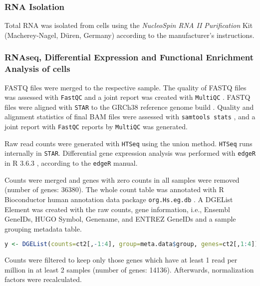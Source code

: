 \subsubsection*{RNA Isolation}
Total RNA was isolated from \INA cells using the \textit{NucleoSpin RNA II
    Purification} Kit (Macherey-Nagel, Düren, Germany) according to the
manufacturer's instructions.






\subsubsection*{RNAseq, Differential Expression and Functional Enrichment Analysis of \INA cells}%
FASTQ files were merged to the respective sample. The quality of FASTQ files was
assessed with \texttt{FastQC} \cite{andrewsFastQCQualityControl2010} and a joint
report was created with \texttt{MultiQC}
\cite{ewelsMultiQCSummarizeAnalysis2016}. FASTQ files were aligned with
\texttt{STAR} \cite{dobinSTARUltrafastUniversal2013} to the GRCh38 reference
genome build \cite{zerbinoEnsembl20182018}. Quality and alignment statistics of
final BAM files were assessed with \texttt{samtools stats}
\cite{liSequenceAlignmentMap2009}, and a joint report with \texttt{FastQC}
reports by \texttt{MultiQC} was generated.

Raw read counts were generated with \texttt{HTSeq}
\cite{andersHTSeqPythonFramework2015} using the union method. \texttt{HTSeq}
runs internally in \texttt{STAR}. Differential gene expression analysis was
performed with \texttt{edgeR} \cite{Robinson:2010:Bioinformatics:19910308} in R
3.6.3 \cite{rcoreteamLanguageEnvironmentStatistical2018}, according to the \texttt{edgeR} manual.

Counts were merged and genes with zero counts in all samples were removed
(number of genes: 36380). The whole count table was annotated with R
Bioconductor human annotation data package
\texttt{org.Hs.eg.db} \cite{carlsonOrgHsEg2016}. A DGEList Element was created
with the raw counts, gene information, i.e., Ensembl GeneIDs, HUGO Symbol,
Genename, and ENTREZ GeneIDs and a sample grouping metadata table.

\begin{lstlisting}[language=R,style=defaultstyle]
y <- DGEList(counts=ct2[,-1:4], group=meta.data$group, genes=ct2[,1:4])
\end{lstlisting}

Counts were filtered to keep only those genes which have at least 1 read per
million in at least 2 samples (number of genes: 14136). Afterwards,
normalization factors were recalculated.

